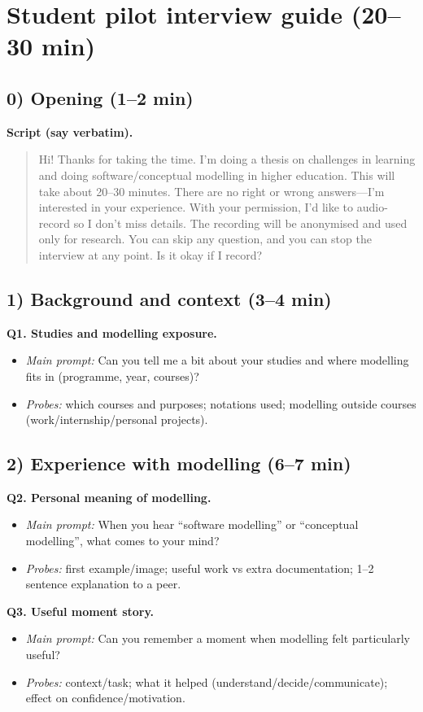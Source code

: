 \section{Student pilot interview guide (20--30 min)}
\label{app:guide_student}

\subsection*{0) Opening (1--2 min)}
\textbf{Script (say verbatim).}
\begin{quote}
Hi! Thanks for taking the time. I’m doing a thesis on challenges in learning and doing software/conceptual modelling in higher education. This will take about 20--30 minutes. There are no right or wrong answers—I’m interested in your experience. With your permission, I’d like to audio-record so I don’t miss details. The recording will be anonymised and used only for research. You can skip any question, and you can stop the interview at any point. Is it okay if I record?
\end{quote}

\subsection*{1) Background and context (3--4 min)}
\textbf{Q1. Studies and modelling exposure.}
\begin{itemize}
  \item \emph{Main prompt:} Can you tell me a bit about your studies and where modelling fits in (programme, year, courses)?
  \item \emph{Probes:} which courses and purposes; notations used; modelling outside courses (work/internship/personal projects).
\end{itemize}

\subsection*{2) Experience with modelling (6--7 min)}
\textbf{Q2. Personal meaning of modelling.}
\begin{itemize}
  \item \emph{Main prompt:} When you hear “software modelling” or “conceptual modelling”, what comes to your mind?
  \item \emph{Probes:} first example/image; useful work vs extra documentation; 1--2 sentence explanation to a peer.
\end{itemize}

\textbf{Q3. Useful moment story.}
\begin{itemize}
  \item \emph{Main prompt:} Can you remember a moment when modelling felt particularly useful?
  \item \emph{Probes:} context/task; what it helped (understand/decide/communicate); effect on confidence/motivation.
\end{itemize}

